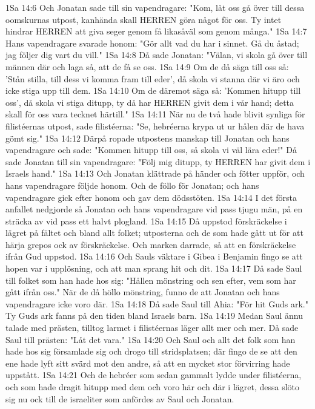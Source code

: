 1Sa 14:6  Och Jonatan sade till sin vapendragare: "Kom, låt oss gå över till dessa oomskurnas utpost, kanhända skall HERREN göra något för oss. Ty intet hindrar HERREN att giva seger genom få likasåväl som genom många."
1Sa 14:7  Hans vapendragare svarade honom: "Gör allt vad du har i sinnet. Gå du åstad; jag följer dig vart du vill."
1Sa 14:8  Då sade Jonatan: "Välan, vi skola gå över till männen där och laga så, att de få se oss.
1Sa 14:9  Om de då säga till oss så: 'Stån stilla, till dess vi komma fram till eder', då skola vi stanna där vi äro och icke stiga upp till dem.
1Sa 14:10  Om de däremot säga så: 'Kommen hitupp till oss', då skola vi stiga ditupp, ty då har HERREN givit dem i vår hand; detta skall för oss vara tecknet härtill."
1Sa 14:11  När nu de två hade blivit synliga för filistéernas utpost, sade filistéerna: "Se, hebréerna krypa ut ur hålen där de hava gömt sig."
1Sa 14:12  Därpå ropade utpostens manskap till Jonatan och hans vapendragare och sade: "Kommen hitupp till oss, så skola vi väl lära eder!" Då sade Jonatan till sin vapendragare: "Följ mig ditupp, ty HERREN har givit dem i Israels hand."
1Sa 14:13  Och Jonatan klättrade på händer och fötter uppför, och hans vapendragare följde honom. Och de föllo för Jonatan; och hans vapendragare gick efter honom och gav dem dödsstöten.
1Sa 14:14  I det första anfallet nedgjorde så Jonatan och hans vapendragare vid pass tjugu män, på en sträcka av vid pass ett halvt plogland.
1Sa 14:15  Då uppstod förskräckelse i lägret på fältet och bland allt folket; utposterna och de som hade gått ut för att härja grepos ock av förskräckelse. Och marken darrade, så att en förskräckelse ifrån Gud uppstod.
1Sa 14:16  Och Sauls väktare i Gibea i Benjamin fingo se att hopen var i upplösning, och att man sprang hit och dit.
1Sa 14:17  Då sade Saul till folket som han hade hos sig: "Hållen mönstring och sen efter, vem som har gått ifrån oss." När de då höllo mönstring, funno de att Jonatan och hans vapendragare icke voro där.
1Sa 14:18  Då sade Saul till Ahia: "För hit Guds ark." Ty Guds ark fanns på den tiden bland Israels barn.
1Sa 14:19  Medan Saul ännu talade med prästen, tilltog larmet i filistéernas läger allt mer och mer. Då sade Saul till prästen: "Låt det vara."
1Sa 14:20  Och Saul och allt det folk som han hade hos sig församlade sig och drogo till stridsplatsen; där fingo de se att den ene hade lyft sitt svärd mot den andre, så att en mycket stor förvirring hade uppstått.
1Sa 14:21  Och de hebréer som sedan gammalt lydde under filistéerna, och som hade dragit hitupp med dem och voro här och där i lägret, dessa slöto sig nu ock till de israeliter som anfördes av Saul och Jonatan.
